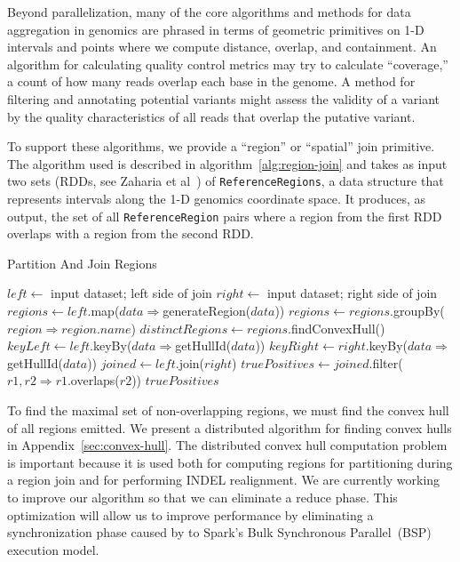 \documentclass{acm_proc_article-sp}
\begin{document}
Beyond parallelization, many of the core algorithms and methods for data aggregation in genomics are phrased
in terms of geometric primitives on 1-D intervals and points where we compute distance, overlap, and
containment.  An algorithm for calculating quality control metrics may try to calculate ``coverage,'' a count
of how many reads overlap each base in the genome. A method for filtering and annotating potential variants
might assess the validity of a variant by the quality characteristics of all reads that overlap the putative variant.

To support these algorithms, we provide a ``region'' or ``spatial'' join primitive. The algorithm used is described
in algorithm~\ref{alg:region-join} and takes as input two sets (RDDs, see Zaharia et al~\cite{zaharia12}) of
\texttt{ReferenceRegions}, a data structure that represents intervals along the 1-D genomics coordinate
space. It produces, as output, the set of all \texttt{ReferenceRegion} pairs where a region from the first RDD
overlaps with a region from the second RDD.

\begin{algorithm}
\caption{Partition And Join Regions}
\label{alg:region-join}
\begin{algorithmic}
\STATE $left \leftarrow$ input dataset; left side of join
\STATE $right \leftarrow$ input dataset; right side of join
\STATE $regions \leftarrow left$.map($data \Rightarrow $generateRegion($data$))
\STATE $regions \leftarrow regions$.groupBy($region \Rightarrow region$.$name$)
\STATE $distinctRegions \leftarrow regions$.findConvexHull()
\STATE $keyLeft \leftarrow left$.keyBy($data \Rightarrow $getHullId($data$))
\STATE $keyRight \leftarrow right$.keyBy($data \Rightarrow $getHullId($data$))
\STATE $joined \leftarrow left$.join($right$)
\STATE $truePositives \leftarrow joined$.filter($r1, r2 \Rightarrow r1$.overlaps($r2$))
\RETURN $truePositives$
\end{algorithmic}
\end{algorithm}

To find the maximal set of non-overlapping regions, we must find the convex hull of all regions emitted.
We present a distributed algorithm for finding convex hulls in Appendix~\ref{sec:convex-hull}. The
distributed convex hull computation problem is important because it is used both for computing regions
for partitioning during a region join and for performing INDEL realignment. We are currently working to
improve our algorithm so that we can eliminate a reduce phase. This optimization will allow us to improve
performance by eliminating a synchronization phase caused by to Spark's Bulk Synchronous
Parallel~(BSP) execution model.
\end{document}

